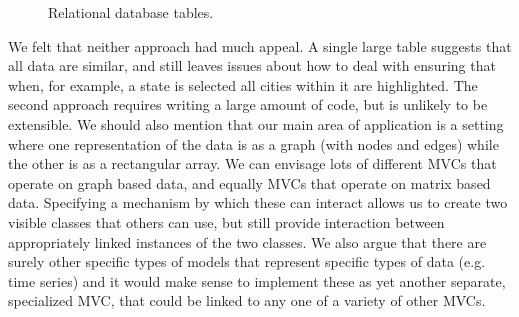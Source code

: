 \documentclass[11pt]{article}
\begin{document}
\begin{figure}[ht]
  \begin{center}
    \hspace{.3in}
    \caption{Relational database tables.}
  \end{center}
\end{figure}

We felt that neither approach had much appeal.  A single large table
suggests that all data are similar, and still leaves issues about how
to deal with ensuring that when, for example, a state is selected all
cities within it are highlighted.  The second approach requires writing a
large amount of code, but is unlikely to be extensible.
We should also mention that our main area of
application is a setting where one representation of the data is as a
graph (with nodes and edges) while the other is as a rectangular array. We can
envisage lots of different MVCs that operate on graph based data, and
equally MVCs that operate on matrix based data. Specifying a mechanism
by which these can interact allows us to create two visible classes
that others can use, but still provide interaction between
appropriately linked instances of the two classes. We also argue that
there are surely other specific types of models that represent
specific types of data (e.g. time series) and it would make sense to
implement these as yet another separate, specialized MVC, that could
be linked to any one of a variety of other MVCs.
\end{document}
